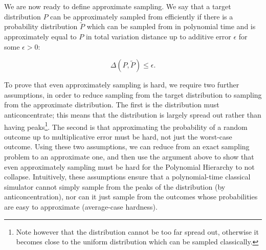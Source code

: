 We are now ready to define approximate sampling. We say that a target distribution $P$ can be approximately sampled from efficiently if there is a probability distribution $\tilde{P}$ which can be sampled from in polynomial time and is approximately equal to $P$ in total variation distance up to additive error $\epsilon$ for some $\epsilon > 0$:

\begin{equation}
\Delta(P, \tilde{P}) \leq \epsilon.
\end{equation}

To prove that even approximately sampling is hard, we require two further assumptions, in order to reduce sampling from the target distribution to sampling from the approximate distribution. The first is the distribution must anticoncentrate; this means that the distribution is largely spread out rather than having peaks\footnote{Note however that the distribution cannot be too far spread out, otherwise it becomes close to the uniform distribution which can be sampled classically.}. The second is that approximating the probability of a random outcome up to multiplicative error must be hard, not just the worst-case outcome. Using these two assumptions, we can reduce from an exact sampling problem to an approximate one, and then use the argument above to show that even approximately sampling must be hard for the Polynomial Hierarchy to not collapse. Intuitively, these assumptions ensure that a polynomial-time classical simulator cannot simply sample from the peaks of the distribution (by anticoncentration), nor can it just sample from the outcomes whose probabilities are easy to approximate (average-case hardness).


